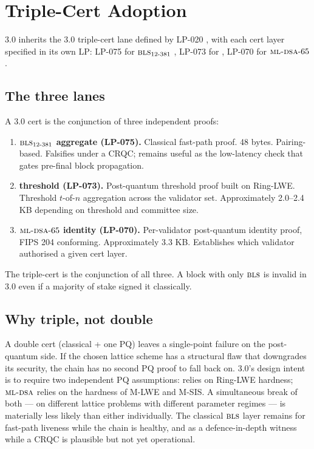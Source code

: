 \section{Triple-Cert Adoption}
\label{sec:triple-cert}

\Zoo{} 3.0 inherits the \Lux{} \Quasar{} 3.0 triple-cert lane defined
by LP-020 \cite{lp-020}, with each cert layer specified in its own LP:
LP-075 for $\textsc{bls}{}_{12\text{-}381}$ \cite{lp-075}, LP-073 for
\Corona{} \cite{lp-073}, LP-070 for $\textsc{ml-dsa}{}\text{-}65$
\cite{lp-070}.

\subsection{The three lanes}

A \Quasar{} 3.0 cert is the conjunction of three independent proofs:

\begin{enumerate}[leftmargin=1.4em]
  \item \textbf{$\textsc{bls}{}_{12\text{-}381}$ aggregate (LP-075).}
        Classical fast-path proof. 48 bytes. Pairing-based.
        Falsifies under a CRQC; remains useful as the low-latency
        check that gates pre-final block propagation.
  \item \textbf{\Corona{} threshold (LP-073).}
        Post-quantum threshold proof built on Ring-LWE. Threshold
        $t$-of-$n$ aggregation across the validator set. Approximately
        2.0--2.4 KB depending on threshold and committee size.
  \item \textbf{$\textsc{ml-dsa}{}\text{-}65$ identity (LP-070).}
        Per-validator post-quantum identity proof, FIPS 204 conforming.
        Approximately 3.3 KB. Establishes which validator authorised
        a given cert layer.
\end{enumerate}

The triple-cert is the conjunction of all three. A block with only
$\textsc{bls}{}$ is invalid in 3.0 even if a majority of stake signed it
classically.

\subsection{Why triple, not double}

A double cert (classical + one PQ) leaves a single-point failure on
the post-quantum side. If the chosen lattice scheme has a structural
flaw that downgrades its security, the chain has no second PQ proof
to fall back on. \Quasar{} 3.0's design intent is to require two
independent PQ assumptions: \Corona{} relies on Ring-LWE hardness;
$\textsc{ml-dsa}{}$ relies on the hardness of M-LWE and M-SIS. A simultaneous
break of both --- on different lattice problems with different
parameter regimes --- is materially less likely than either
individually. The classical $\textsc{bls}{}$ layer remains for fast-path
liveness while the chain is healthy, and as a defence-in-depth
witness while a CRQC is plausible but not yet operational.

